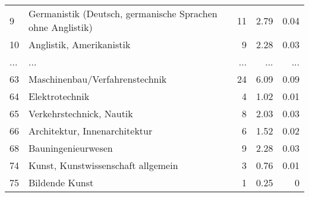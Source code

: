 \begin{longtable}{lXrrr}
        9 & \multicolumn{1}{X}{Germanistik (Deutsch, germanische Sprachen ohne Anglistik)} & %
          \num{11} &
          \num[round-mode=places,round-precision=2]{2,79} &
          \num[round-mode=places,round-precision=2]{0,04} \\
        10 & \multicolumn{1}{X}{Anglistik, Amerikanistik} & %
          \num{9} &
          \num[round-mode=places,round-precision=2]{2,28} &
          \num[round-mode=places,round-precision=2]{0,03} \\
       ... & ... & ... & ... & ... \\
        63 & \multicolumn{1}{X}{Maschinenbau/Verfahrenstechnik} & %
          \num{24} &
          \num[round-mode=places,round-precision=2]{6,09} &
          \num[round-mode=places,round-precision=2]{0,09} \\

        64 & \multicolumn{1}{X}{Elektrotechnik} & %
          \num{4} &
          \num[round-mode=places,round-precision=2]{1,02} &
          \num[round-mode=places,round-precision=2]{0,01} \\

        65 & \multicolumn{1}{X}{Verkehrstechnick, Nautik} & %
          \num{8} &
          \num[round-mode=places,round-precision=2]{2,03} &
          \num[round-mode=places,round-precision=2]{0,03} \\

        66 & \multicolumn{1}{X}{Architektur, Innenarchitektur} & %
          \num{6} &
          \num[round-mode=places,round-precision=2]{1,52} &
          \num[round-mode=places,round-precision=2]{0,02} \\

        68 & \multicolumn{1}{X}{Bauningenieurwesen} & %
          \num{9} &
          \num[round-mode=places,round-precision=2]{2,28} &
          \num[round-mode=places,round-precision=2]{0,03} \\

        74 & \multicolumn{1}{X}{Kunst, Kunstwissenschaft allgemein} & %
          \num{3} &
          \num[round-mode=places,round-precision=2]{0,76} &
          \num[round-mode=places,round-precision=2]{0,01} \\

        75 & \multicolumn{1}{X}{Bildende Kunst} & %
          \num{1} &
          \num[round-mode=places,round-precision=2]{0,25} &
          \num[round-mode=places,round-precision=2]{0} \\


\end{longtable}
